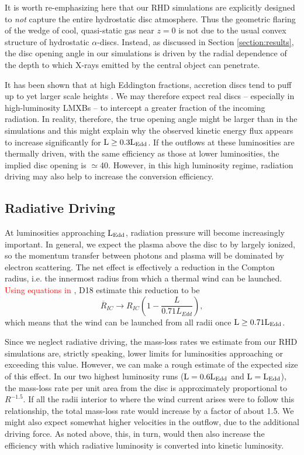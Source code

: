 \documentclass[a4paper,fleqn,usenatbib]{mnras}
\begin{document}
It is worth re-emphasizing here that our RHD simulations are
explicitly designed to {\em not} capture the entire hydrostatic disc
atmosphere. Thus the geometric flaring of the wedge of cool,
quasi-static gas near $z=0$ is not due to the usual convex structure
of hydrostatic $\alpha$-discs. Instead, as discussed
in Section \ref{section:results}, the disc opening angle in our simulations
is driven by the radial dependence of the depth to which X-rays
emitted by the central object can penetrate.

It has been shown that at high Eddington
fractions,  accretion discs tend to puff up to yet larger scale heights
\citep[][but also see
\citealt{2016A&A...587A..13L}]{1988ApJ...332..646A,2005MNRAS.357..295O}. We
may therefore expect real discs -- especially in high-luminosity LMXBs
-- to intercept a greater fraction of the incoming radiation. 
In reality, therefore, the true opening angle might be larger than in
the simulations and this
might explain why the observed kinetic energy flux appears to increase
significantly for $\rm{L \geq 0.3L_{Edd}}$. If the outflows at these
luminosities are thermally driven, with the same efficiency as those
at lower luminosities, the implied disc opening is
$\simeq$40\degree. However, in this high luminosity regime, radiation
driving may also help to increase the conversion efficiency.

\subsection{Radiative Driving}
\label{section:radiative_driving}

At luminosities approaching $\rm{L_{Edd}}$, radiation pressure will
become increasingly important. In general, we expect the plasma above
the disc to by largely ionized, so the momentum transfer between
photons and plasma will be dominated by electron scattering. The net
effect is effectively a reduction in the Compton radius, i.e. the
innermost radius from which a thermal wind can be
launched. \textcolor{red}{Using equations in \cite{2002ApJ...565..455P}},
 D18 estimate this reduction to be 
\begin{equation}
\overline{R}_{IC} \rightarrow R_{IC}\left(1-\frac{L}{0.71L_{Edd}}\right),
\end{equation}
which means that the wind can be launched from all radii once 
$\rm{L \geq 0.71L_{Edd}}$.

Since we neglect radiative driving, the mass-loss rates we estimate from
our RHD simulations are, strictly speaking, lower limits for
luminosities approaching or exceeding this value. However, we can make
a rough estimate of the expected size of this effect. In our two
highest luminosity runs ($\rm{L = 0.6L_{Edd}}$ and $\rm{L =
L_{Edd}}$), the mass-loss rate per unit area from the disc is
approximately proportional to $R^{-1.5}$. If all the radii interior to
where the wind current arises were to follow this relationship, the
total mass-loss rate would increase by a factor of about 1.5.  We
might also expect somewhat higher velocities in the outflow, due to
the additional driving force. As noted above, this, in turn, would
then also increase the efficiency with which radiative luminosity is
converted into kinetic luminosity.
\end{document}
